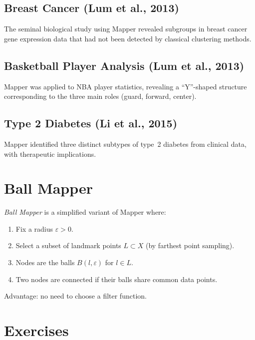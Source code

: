 \subsection{Breast Cancer (Lum et al., 2013)}
The seminal biological study using Mapper revealed subgroups in breast
cancer gene expression data that had not been detected by classical
clustering methods.

\subsection{Basketball Player Analysis (Lum et al., 2013)}
Mapper was applied to NBA player statistics, revealing a ``Y''-shaped
structure corresponding to the three main roles (guard, forward,
center).

\subsection{Type 2 Diabetes (Li et al., 2015)}
Mapper identified three distinct subtypes of type~2 diabetes from
clinical data, with therapeutic implications.

\section{Ball Mapper}

\begin{definition}
\emph{Ball Mapper} is a simplified variant of Mapper where:
\begin{enumerate}
  \item Fix a radius $\varepsilon > 0$.
  \item Select a subset of landmark points $L \subset X$ (by farthest
        point sampling).
  \item Nodes are the balls $B(l, \varepsilon)$ for $l \in L$.
  \item Two nodes are connected if their balls share common data points.
\end{enumerate}
Advantage: no need to choose a filter function.
\end{definition}

\section{Exercises}

